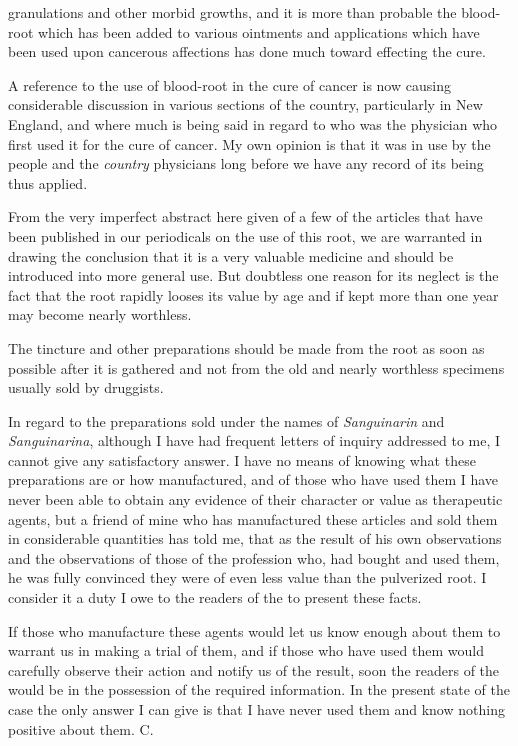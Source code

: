 granulations and other morbid growths, and it is more than probable
the blood-root which has been added to various ointments and
applications which have been used upon cancerous affections has done
much toward effecting the cure.

A reference to the use of blood-root in the cure of cancer is now
causing considerable discussion in various sections of the country, particularly
in New England, and where much is being said in regard to
who was the physician who first used it for the cure of cancer. My
own opinion is that it was in use by the people and the \emph{country} physicians
long before we have any record of its being thus applied.

From the very imperfect abstract here given of a few of the articles
that have been published in our periodicals on the use of this root, we are
warranted in drawing the conclusion that it is a very valuable medicine
and should be introduced into more general use. But doubtless one
reason for its neglect is the fact that the root rapidly looses its value by
age and if kept more than one year may become nearly worthless.

The tincture and other preparations should be made from the root as
soon as possible after it is gathered and not from the old and nearly
worthless specimens usually sold by druggists.

In regard to the preparations sold under the names of \emph{Sanguinarin}
and \emph{Sanguinarina}, although I have had frequent letters of inquiry
addressed to me, I cannot give any satisfactory answer. I have no
means of knowing what these preparations are or how manufactured,
and of those who have used them I have never been able to obtain any
evidence of their character or value as therapeutic agents, but a friend
of mine who has manufactured these articles and sold them in considerable
quantities has told me, that as the result of his own observations
and the observations of those of the profession who, had bought and
used them, he was fully convinced they were of even less value than
the pulverized root. I consider it a duty I owe to the readers of the
 to present these facts.

If those who manufacture these agents would let us know enough
about them to warrant us in making a trial of them, and if those who
have used them would carefully observe their action and notify us of
the result, soon the readers of the  would be in the possession
of the required information. In the present state of the case the only
answer I can give is that I have never used them and know nothing
positive about them. \hfill{}C.\endinput
